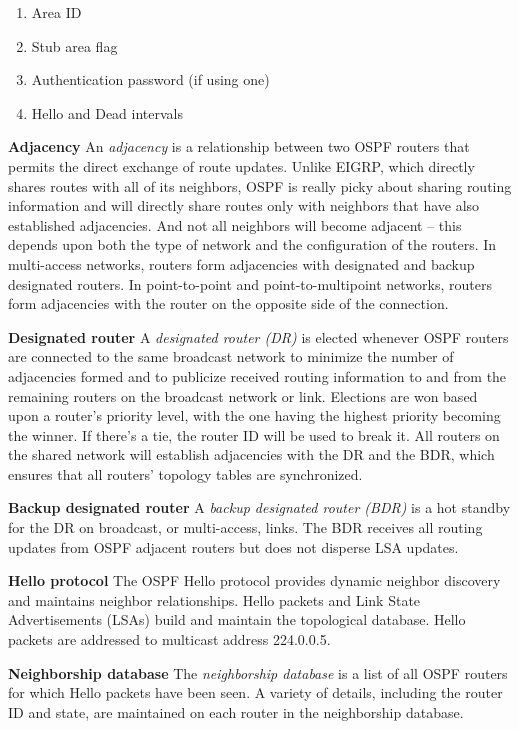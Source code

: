 \begin{enumerate}
\item
  Area ID
\item
  Stub area flag
\item
  Authentication password (if using one)
\item
  Hello and Dead intervals
\end{enumerate}

\textbf{Adjacency} An \emph{adjacency} is a relationship between two
OSPF routers that permits the direct exchange of route updates. Unlike
EIGRP, which directly shares routes with all of its neighbors, OSPF is
really picky about sharing routing information and will directly share
routes only with neighbors that have also established adjacencies. And
not all neighbors will become adjacent -- this depends upon both the type
of network and the configuration of the routers. In multi-access
networks, routers form adjacencies with designated and backup designated
routers. In point-to-point and point-to-multipoint networks, routers
form adjacencies with the router on the opposite side of the connection.

\textbf{Designated router} A \emph{designated router (DR)} is elected
whenever OSPF routers are connected to the same broadcast network to
minimize the number of adjacencies formed and to publicize received
routing information to and from the remaining routers on the broadcast
network or link. Elections are won based upon a router's priority level,
with the one having the highest priority becoming the winner. If there's
a tie, the router ID will be used to break it. All routers on the shared
network will establish adjacencies with the DR and the BDR, which
ensures that all routers' topology tables are synchronized.

\protect\hypertarget{c18.xhtmlux5cux23Page_750}{}{}\textbf{Backup
designated router} A \emph{backup designated router (BDR)} is a hot
standby for the DR on broadcast, or multi-access, links. The BDR
receives all routing updates from OSPF adjacent routers but does not
disperse LSA updates.

\textbf{Hello protocol} The OSPF Hello protocol provides dynamic
neighbor discovery and maintains neighbor relationships. Hello packets
and Link State Advertisements (LSAs) build and maintain the topological
database. Hello packets are addressed to multicast address 224.0.0.5.

\textbf{Neighborship database} The \emph{neighborship database} is a
list of all OSPF routers for which Hello packets have been seen. A
variety of details, including the router ID and state, are maintained on
each router in the neighborship database.

